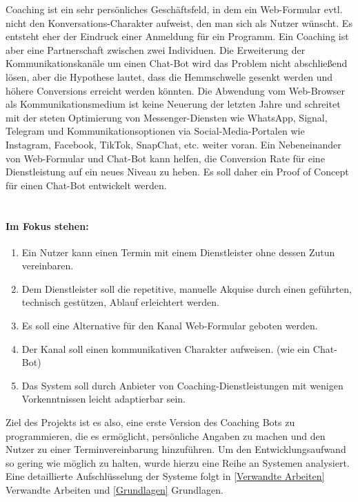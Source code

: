     Coaching ist ein sehr persönliches Geschäftsfeld, in dem ein Web-Formular evtl. nicht den Konversations-Charakter aufweist, den man sich als Nutzer wünscht. Es entsteht eher der Eindruck einer Anmeldung für ein Programm. Ein Coaching ist aber eine Partnerschaft zwischen zwei Individuen. Die Erweiterung der Kommunikationskanäle um einen Chat-Bot wird das Problem nicht abschließend lösen, aber die Hypothese lautet, dass die Hemmschwelle gesenkt werden und höhere Conversions erreicht werden könnten. Die Abwendung vom Web-Browser als Kommunikationsmedium ist keine Neuerung der letzten Jahre und schreitet mit der steten Optimierung von Messenger-Diensten wie WhatsApp, Signal, Telegram und Kommunikationsoptionen via Social-Media-Portalen wie Instagram, Facebook, TikTok, SnapChat, etc. weiter voran. Ein Nebeneinander von Web-Formular und Chat-Bot kann helfen, die Conversion Rate für eine Dienstleistung auf ein neues Niveau zu heben. \cite{conversion} Es soll daher ein Proof of Concept für einen Chat-Bot entwickelt werden.\\ 
    \\ 
    \paragraph{Im Fokus stehen:}
    \begin{enumerate}
        \item Ein Nutzer kann einen Termin mit einem Dienstleister ohne dessen Zutun vereinbaren.
        \item Dem Dienstleister soll die repetitive, manuelle Akquise durch einen geführten, technisch gestützen, Ablauf erleichtert werden. 
        \item Es soll eine Alternative für den Kanal Web-Formular geboten werden. 
        \item Der Kanal soll einen kommunikativen Charakter aufweisen. (wie ein Chat-Bot)
        \item Das System soll durch Anbieter von Coaching-Dienstleistungen mit wenigen Vorkenntnissen leicht adaptierbar sein.
    \end{enumerate}
    
    Ziel des Projekts ist es also, eine erste Version des Coaching Bots zu programmieren, die es ermöglicht, persönliche Angaben zu machen und den Nutzer zu einer Terminvereinbarung hinzuführen. Um den Entwicklungsaufwand so gering wie möglich zu halten, wurde hierzu eine Reihe an Systemen analysiert. Eine detaillierte Aufschlüsselung der Systeme folgt in \ref{Verwandte Arbeiten} Verwandte Arbeiten und \ref{Grundlagen} Grundlagen.




